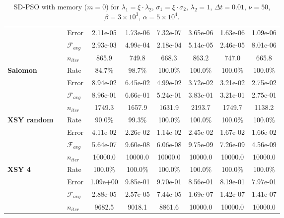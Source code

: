 \documentclass{ims9x6}
\begin{document}
\begin{table}[tb]
\begin{center}
{{\begin{tabular}{l|lccc|ccc}
& Error &  2.11e-05 & 1.73e-06 & 7.32e-07 &  3.65e-06 & 1.63e-06 & 1.09e-06\\
& $\mathcal{F}_{avg}$ &2.93e-03 & 4.99e-04 & 2.18e-04 &5.14e-05 & 2.46e-05 & 8.01e-06 \\
& $n_{iter}$ &865.9 & 749.8 & 668.3 &863.2 & 747.0 & 665.8 \\
\hline
{\rm \textbf{Salomon}}& Rate  & 84.7\% & 98.7\% & 100.0\% &100.0\% & 100.0\% & 100.0\% \\
& Error & 8.94e-02 & 6.45e-02 & 4.99e-02 & 3.72e-02 & 3.21e-02 & 2.75e-02\\
& $\mathcal{F}_{avg}$ &8.96e-01 & 6.66e-01 & 5.24e-01&3.83e-01 & 3.21e-01 & 2.75e-01 \\
& $n_{iter}$ &1749.3 & 1657.9 & 1631.9 &2193.7 & 1749.7 & 1138.2\\
\hline
{\rm \textbf{XSY random \ }}& Rate  &90.0\% & 99.3\% & 100.0\% &100.0\% & 100.0\% & 100.0\% \\
& Error &  4.11e-02 & 2.26e-02 & 1.14e-02 &   2.45e-02 & 1.67e-02 & 1.66e-02\\
& $\mathcal{F}_{avg}$ &5.64e-07 & 9.60e-08 & 6.06e-08 &9.75e-09 & 7.26e-09 & 4.56e-09 \\
& $n_{iter}$ &10000.0 & 10000.0 & 10000.0 &10000.0 & 10000.0 & 10000.0\\
\hline
{\rm \textbf{XSY 4 \ }}& Rate  &100.0\% & 100.0\% & 100.0\% & 100.0\% & 100.0\% & 100.0\% \\
& Error &  1.09e+00 & 9.85e-01 & 9.70e-01 & 8.56e-01 & 8.19e-01 & 7.97e-01\\
& $\mathcal{F}_{avg}$ & 2.88e-05 & 2.57e-05 & 7.44e-05 & 1.69e-07 & 1.42e-07 & 1.41e-07 \\
& $n_{iter}$ &9682.5 & 9018.1 & 8861.6 &10000.0 & 10000.0 & 10000.0\\

\hline  
\hline    
\end{tabular}}}
\end{center}
\caption{SD-PSO with memory ($m=0$) for $\lambda_1 = \xi \cdot \lambda_2$, $\sigma_1 = \xi \cdot \sigma_2$, $\lambda_2=1$, $\Delta t = 0.01$, $\nu=50$, $\beta = 3 \times 10^3$, $\alpha = 5 \times 10^4$.}
\label{tab:TestFunctions}
\end{table}
\end{document}
